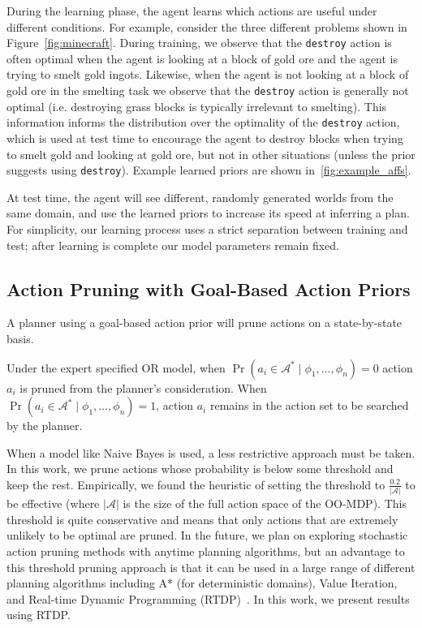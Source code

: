 \documentclass[letterpaper]{article}
\begin{document}
During the learning phase, the agent learns which actions are useful
under different conditions.  For example, consider the three different
problems shown in Figure~\ref{fig:minecraft}.  During training, we observe
that the \texttt{destroy} action is often optimal when the agent is
looking at a block of gold ore and the agent is trying to smelt gold
ingots.  Likewise, when the agent is not looking at a block of gold
ore in the smelting task we observe that the \texttt{destroy} action
is generally not optimal (i.e. destroying grass blocks is typically
irrelevant to smelting).  This information informs the distribution
over the optimality of the \texttt{destroy} action, which is used at
test time to encourage the agent to destroy blocks when trying to
smelt gold and looking at gold ore, but not in other situations
(unless the prior suggests using \texttt{destroy}). Example
learned priors are shown in~\ref{fig:example_affs}.

At test time, the agent will see different, randomly generated worlds
from the same domain, and use the learned priors to increase its
speed at inferring a plan.  For simplicity, our learning process uses
a strict separation between training and test; after learning is
complete our model parameters remain fixed. 

\subsection{Action Pruning with Goal-Based Action Priors}
\label{sec:action_pruning}
A planner using a goal-based action prior will prune actions on a state-by-state basis. 

Under the expert specified OR model, when $\Pr(a_i \in \mathcal{A}^*  \mid \phi_1, \ldots, \phi_n) = 0$
action $a_i$ is pruned from the planner's consideration. When
$\Pr(a_i \in \mathcal{A}^*  \mid \phi_1, \ldots, \phi_n) = 1$,
action $a_i$ remains in the action set to be searched by the planner.

When a model like Naive Bayes is used, a less restrictive approach must be taken. In this work,
we prune actions whose probability is below some threshold and
keep the rest. Empirically, we found the heuristic
of setting the threshold to $\frac{0.2}{|\mathcal{A}|}$ to
be effective (where $|\mathcal{A}|$ is the size
of the full action space of the OO-MDP). This threshold is
quite conservative and means that only actions
that are extremely unlikely to be optimal are pruned. 
In the future, we plan on exploring
stochastic action pruning methods with anytime planning
algorithms, but an advantage to this threshold pruning
approach is that it can be used in a large range of different
planning algorithms including A* (for deterministic domains),
Value Iteration, and Real-time
Dynamic Programming (RTDP)~\cite{barto95}. In this work, we present results 
using RTDP.
\end{document}
